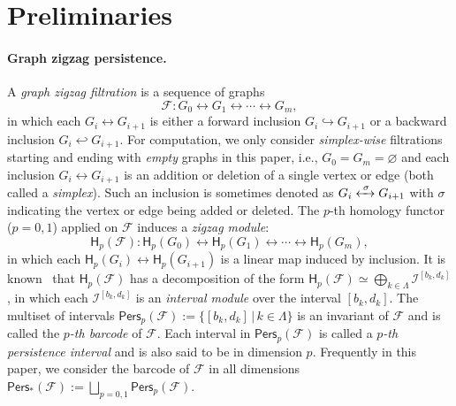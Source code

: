 \documentclass[letterpaper,11pt]{article}
\theoremstyle{mythmstyle}
\theoremstyle{mydefstyle}
\theoremstyle{plain}
\theoremstyle{definition}
\newcommand{\Hm}{\mathsf{H}}
\newcommand{\Pers}{\mathsf{Pers}}
\newcommand{\<}[1]{\langle #1\rangle}
\newcommand{\lbarrowspace}{\;}
\newcommand{\lrarrowsp}[1]{\xleftrightarrow{\lbarrowspace#1\lbarrowspace}}
\let\leftrightarrowsp\lrarrowsp
\newcommand{\incto}{\hookrightarrow}
\newcommand{\bakincto}{\hookleftarrow}
\newcommand{\given}{\,|\,}
\newcommand{\Set}[1]{\{#1\}}
\let\emptyset\varnothing
\newcommand{\Fcal}{\mathcal{F}}
\newcommand{\Ical}{\mathcal{I}}
\newcommand{\LG}{\Lambda}
\newcommand{\sG}{\sigma}
\newcommand{\Dim}{p}
\newcommand{\birth}{b}
\newcommand{\death}{d}
\newcommand{\filtcnt}{m}
\theoremstyle{definition}
\begin{document}
\section{Preliminaries}




\paragraph{Graph zigzag persistence.}

A {\it graph zigzag filtration} 
is a sequence of graphs
\begin{equation}\label{eqn:prelim-zz}
\Fcal: G_0 \leftrightarrow G_1 \leftrightarrow 
\cdots \leftrightarrow G_\filtcnt,
\end{equation}
in which each
$G_i\leftrightarrow G_{i+1}$ is either a forward inclusion $G_i\incto G_{i+1}$
or a backward inclusion $G_i\bakincto G_{i+1}$.
For computation,
we only consider \emph{simplex-wise} filtrations 
starting and ending with \emph{empty} graphs
in this paper, i.e.,
$G_0=G_\filtcnt=\emptyset$ and
each inclusion $G_i\leftrightarrow G_{i+1}$ is an addition or deletion
of a single vertex or edge (both called a \emph{simplex}).
Such an inclusion is sometimes denoted as $G_i\leftrightarrowsp{\sG} G_{i+1}$
with $\sG$ indicating the vertex or edge being added or deleted.
The $\Dim$-th homology functor ($p=0,1$) applied on $\Fcal$
induces a {\it zigzag module}:
\begin{equation*}
\Hm_\Dim(\Fcal): 
\Hm_\Dim(G_0) 
\leftrightarrow
\Hm_\Dim(G_1) 
\leftrightarrow
\cdots 
\leftrightarrow
\Hm_\Dim(G_\filtcnt), 
\end{equation*}
in which
each $\Hm_\Dim(G_i)\leftrightarrow \Hm_\Dim(G_{i+1})$
is a linear map induced by inclusion.
It is known~\cite{carlsson2010zigzag,Gabriel72} that
$\Hm_\Dim(\Fcal)$ has a decomposition of the form
$\Hm_\Dim(\Fcal)\simeq\bigoplus_{k\in\LG}\Ical^{[\birth_k,\death_k]}$,
in which each $\Ical^{[\birth_k,\death_k]}$
is an
{\it interval module} over the interval $[\birth_k,\death_k]$.
The multiset of intervals
$\Pers_\Dim(\Fcal):=\Set{[\birth_k,\death_k]\given k\in\LG}$
is an invariant of $\Fcal$
and is called the {\it $\Dim$-th barcode} of $\Fcal$.
Each interval in $\Pers_\Dim(\Fcal)$ is called a {\it $\Dim$-th persistence interval}
and is also said to be in dimension $\Dim$.
Frequently in this paper, we consider the barcode of $\Fcal$ in all dimensions
$\Pers_*(\Fcal):=\bigsqcup_{\Dim= 0,1}\Pers_\Dim(\Fcal)$.
\end{document}
